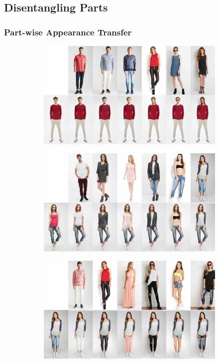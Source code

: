 	\subsection{Disentangling Parts}
		\begin{frame}[t]
		\frametitle{Part-wise Appearance Transfer}
			\begin{figure}[htp]
				\begin{subfigure}{0.49\linewidth}
				\centering
				\includegraphics[trim={0cm 0cm 0cm 0cm},clip, width=1.\linewidth]{fig/factor/part6_01}\caption{}
				\label{fig:part3_00}
				\end{subfigure}
				\begin{subfigure}{0.49\linewidth}
				\centering
				\includegraphics[trim={0cm 0cm 0cm 0cm},clip, width=1.\linewidth]{fig/factor/part6_10}\caption{}
				\label{fig:part3_11}
				\end{subfigure}
				\begin{subfigure}{0.49\linewidth}
				\centering
				\includegraphics[trim={0cm 0cm 0cm 0cm},clip, width=1.\linewidth]{fig/factor/part6_21}\caption{}

\end{subfigure}
\end{figure}
\end{frame}
